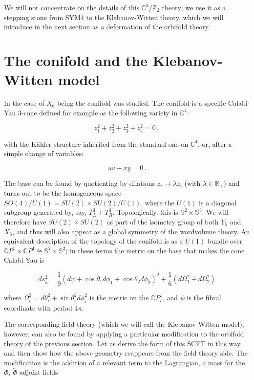 We will not concentrate on the details of this $\mathbb{C}^3/\mathbb{Z}_2$ theory; we use it as a stepping stone from SYM4 to the Klebanov-Witten theory, which we will introduce in the next section as a deformation of the orbifold theory.

\section{The conifold and the Klebanov-Witten model} \label{sec:KW}

In \cite{KW_SCFT} the case of $X_6$ being the conifold was studied. The conifold is a specific Calabi-Yau 3-cone defined for example as the following variety in $\mathbb{C}^4$:

\begin{equation}
	z_1^2 + z_2^2 + z_3^2 + z_4^2 = 0\,,
\end{equation}

with the K\"ahler structure inherited from the standard one on $\mathbb{C}^4$, or, after a simple change of variables:

\begin{equation}
	u v - xy = 0\,.
	\label{}
\end{equation}

The base can be found by quotienting by dilations $z_i \rightarrow \lambda z_i$ (with $\lambda \in \mathbb{R}_+$) and turns out to be the homogeneous space $SO(4)/U(1) = SU(2)\times SU(2) / U(1)$, where the $U(1)$ is a diagonal subgroup generated by, say, $T^3_L + T^3_R$. Topologically, this is $\mathbb{S}^2 \times \mathbb{S}^3$. We will therefore have $SU(2)\times SU(2)$ as part of the isometry group of both $Y_5$ and $X_6$, and thus will also appear as a global symmetry of the wordvolume theory. An equivalent description of the topology of the conifold is as a $U(1)$ bundle over $\mathbb{C}P^1 \times \mathbb{C}P^1 \cong \mathbb{S}^2 \times \mathbb{S}^2$; in these terms the metric on the base that makes the cone Calabi-Yau is

\begin{equation}
	ds^2_5 = \frac{1}{9} (d\psi + \cos\theta_1 d\phi_1 + \cos\theta_2 d\phi_2)^2 + \frac{1}{6} (d\Omega_1^2 + d\Omega_2^2)
\end{equation}

where $\Omega_i^2 = d\theta_i^2 + \sin\theta_i^2 d\phi_i^2$ is the metric on the $\mathbb{C}P^1_i$, and $\psi$ is the fibral coordinate with period $4\pi$.

The corresponding field theory (which we will call the Klebanov-Witten model), however, can also be found by applying a particular modification to the orbifold theory of the previous section\cite{KW_SCFT}. Let us derive the form of this SCFT in this way, and then show how the above geometry reappears from the field theory side. The modification is the addition of a relevant term to the Lagrangian, a mass for the $\Phi$, $\tilde\Phi$ adjoint fields

